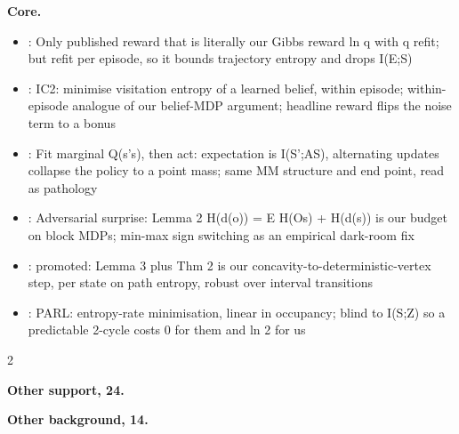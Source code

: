\documentclass[10pt]{article}
\newcommand{\memb}[1]{\par\smallskip\textbf{#1}\quad}
\begin{document}
\memb{Core.}
\begin{itemize}[nosep,leftmargin=1.2em]
\item \citet{Berseth-smirl21}: Only published reward that is literally our Gibbs reward ln q with q refit; but refit per episode, so it bounds trajectory entropy and drops I(E;S)
\item \citet{Rhinehart-information21}: IC2: minimise visitation entropy of a learned belief, within episode; within-episode analogue of our belief-MDP argument; headline reward flips the noise term to a bonus
\item \citet{Yu-boredom18}: Fit marginal Q(s'\textbar{}s), then act: expectation is I(S';A\textbar{}S), alternating updates collapse the policy to a point mass; same MM structure and end point, read as pathology
\item \citet{Fickinger-explore21}: Adversarial surprise: Lemma 2 H(d(o)) = E H(O\textbar{}s) + H(d(s)) is our budget on block MDPs; min-max sign switching as an empirical dark-room fix
\item \citet{vanZutphen-predictable24}: promoted: Lemma 3 plus Thm 2 is our concavity-to-deterministic-vertex step, per state on path entropy, robust over interval transitions
\item \citet{JarneOrnia-predictable25}: PARL: entropy-rate minimisation, linear in occupancy; blind to I(S;Z) so a predictable 2-cycle costs 0 for them and ln 2 for us
\end{itemize}
\begin{multicols}{2}
\memb{Other support, 24.} \citetext{\citealp{Hamann-evolution14}\dag; \citealp{Kaiser-engineered19}; \citealp{Kaiser-evolution20}; \citealp{Ovalle-modulation20}; \citealp{Wang-influencing21}; \citealp{Suri-surprise22}; \citealp{Sun-improving23}\dag; \citealp{CreusCastanyer-improving24}; \citealp{Kubota-cyclic25}\dag; \citealp{Magrans-curiosity18}; \citealp{Zhao-mixture22}; \citealp{Hugessen-surprise24}; \citealp{Furutanpey-principled26}; \citealp{Park-predictable23}; \citealp{Sennesh-deriving23}; \citealp{Tishby-information11}; \citealp{Ortega-thermodynamics13}; \citealp{Goyal-infobot19}; \citealp{Eysenbach-robust21}; \citealp{Saanum-reinforcement23}; \citealp{You-maximum25}; \citealp{You-trajectory25}; \citealp{Sancaktar-regularity23}; \citealp{Agarwal-unreasonable25}}

\memb{Other background, 14.} {\footnotesize \citetext{\citealp{Chen-reinforcement20}; \citealp{Arnold-adapting21}; \citealp{Kucukoglu-efficient22}; \citealp{Hou-cooperative25}\dag; \citealp{Biondi-maximizing13}\dag; \citealp{George-markov19}\dag; \citealp{Duan-markov20}; \citealp{ChivaGil-predictability24}; \citealp{Shah-emergence26}; \citealp{You-rollout25}; \citealp{Dragan-legibility13}\dag; \citealp{Wang-tent21}; \citealp{Prabhudesai-maximizing25}; \citealp{Zhao-learning25}}}

\end{multicols}
\end{document}
